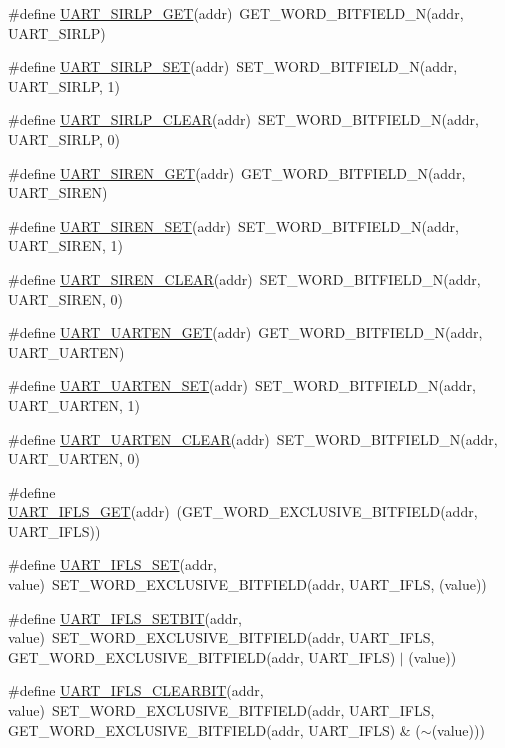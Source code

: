 \begin{DoxyCompactItemize}
\item 
\#define \hyperlink{a00574_ace7bddf7f2d97a56e93aa3c88047d699}{UART\_\-SIRLP\_\-GET}(addr)~GET\_\-WORD\_\-BITFIELD\_\-N(addr, UART\_\-SIRLP)
\item 
\#define \hyperlink{a00574_afde966fdf51c16690eb6b97a444f885a}{UART\_\-SIRLP\_\-SET}(addr)~SET\_\-WORD\_\-BITFIELD\_\-N(addr, UART\_\-SIRLP, 1)
\item 
\#define \hyperlink{a00574_acfbaa1ceb4e148b162fc91fff3dca699}{UART\_\-SIRLP\_\-CLEAR}(addr)~SET\_\-WORD\_\-BITFIELD\_\-N(addr, UART\_\-SIRLP, 0)
\item 
\#define \hyperlink{a00574_a56373d08b42de59742e2597e2ab85369}{UART\_\-SIREN\_\-GET}(addr)~GET\_\-WORD\_\-BITFIELD\_\-N(addr, UART\_\-SIREN)
\item 
\#define \hyperlink{a00574_a6f306ed90fc4daa5606446f2e689b83a}{UART\_\-SIREN\_\-SET}(addr)~SET\_\-WORD\_\-BITFIELD\_\-N(addr, UART\_\-SIREN, 1)
\item 
\#define \hyperlink{a00574_a5128620e2afe5b1f1bb5086ffebdfb22}{UART\_\-SIREN\_\-CLEAR}(addr)~SET\_\-WORD\_\-BITFIELD\_\-N(addr, UART\_\-SIREN, 0)
\item 
\#define \hyperlink{a00574_a9bdc141e04b9b0000d9f0b7b16fdfa96}{UART\_\-UARTEN\_\-GET}(addr)~GET\_\-WORD\_\-BITFIELD\_\-N(addr, UART\_\-UARTEN)
\item 
\#define \hyperlink{a00574_ad28385ab9f4ae17c2b4bc088a36a89d5}{UART\_\-UARTEN\_\-SET}(addr)~SET\_\-WORD\_\-BITFIELD\_\-N(addr, UART\_\-UARTEN, 1)
\item 
\#define \hyperlink{a00574_a07c838fb402471965d94eae07f2bacfa}{UART\_\-UARTEN\_\-CLEAR}(addr)~SET\_\-WORD\_\-BITFIELD\_\-N(addr, UART\_\-UARTEN, 0)
\item 
\#define \hyperlink{a00574_af6712af1cc5e0e834ca903d331131f3b}{UART\_\-IFLS\_\-GET}(addr)~(GET\_\-WORD\_\-EXCLUSIVE\_\-BITFIELD(addr, UART\_\-IFLS))
\item 
\#define \hyperlink{a00574_acd6cd4dab9f2d867a1affecf2a4266e8}{UART\_\-IFLS\_\-SET}(addr, value)~SET\_\-WORD\_\-EXCLUSIVE\_\-BITFIELD(addr, UART\_\-IFLS, (value))
\item 
\#define \hyperlink{a00574_a67ee2cf34975a67d93b44b127ebacb4d}{UART\_\-IFLS\_\-SETBIT}(addr, value)~SET\_\-WORD\_\-EXCLUSIVE\_\-BITFIELD(addr, UART\_\-IFLS, GET\_\-WORD\_\-EXCLUSIVE\_\-BITFIELD(addr, UART\_\-IFLS) $|$ (value))
\item 
\#define \hyperlink{a00574_a41f00a9ee2f44e6b642037ba20957394}{UART\_\-IFLS\_\-CLEARBIT}(addr, value)~SET\_\-WORD\_\-EXCLUSIVE\_\-BITFIELD(addr, UART\_\-IFLS, GET\_\-WORD\_\-EXCLUSIVE\_\-BITFIELD(addr, UART\_\-IFLS) \& ($\sim$(value)))

\end{DoxyCompactItemize}
